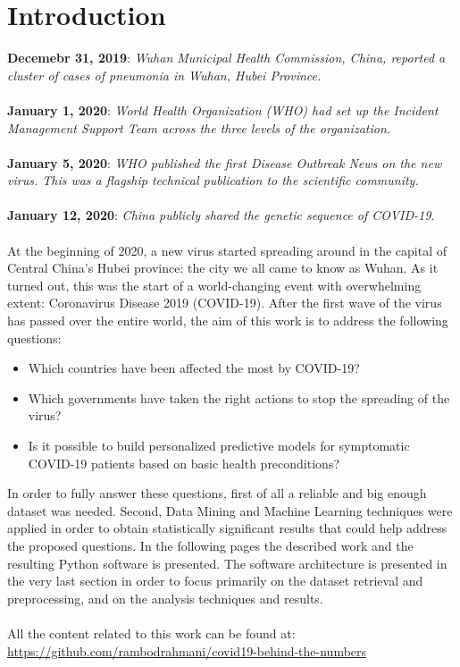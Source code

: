 \documentclass[11pt,a4paper]{article}
\begin{document}
\section{Introduction}
\textbf{Decemebr 31, 2019}: \textit{Wuhan Municipal Health Commission, China,
reported a cluster of cases of pneumonia in Wuhan, Hubei Province.}\\
\\
\textbf{January 1, 2020}: \textit{World Health Organization (WHO) had set up the
Incident Management Support Team across the three levels of the organization.}\\
\\
\textbf{January 5, 2020}: \textit{WHO published the first Disease Outbreak News
on the new virus. This was a flagship technical publication to the scientific
community.}\\
\\
\textbf{January 12, 2020}: \textit{China publicly shared the genetic sequence of
COVID-19.}\\
\\
At the beginning of 2020, a new virus started spreading around in the capital of
Central China's Hubei province: the city we all came to know as Wuhan. As it
turned out, this was the start of a world-changing event with overwhelming
extent: Coronavirus Disease 2019 (COVID-19). After the first wave of the virus
has passed over the entire world, the aim of this work is to address the
following questions:
\begin{itemize}
	\item Which countries have been affected the most by COVID-19?
	\item Which governments have taken the right actions to stop the
		spreading of the virus?
	\item Is it possible to build personalized predictive models for
		symptomatic COVID-19 patients based on basic health preconditions?
\end{itemize}
In order to fully answer these questions, first of all a reliable and big enough
dataset was needed. Second, Data Mining and Machine Learning techniques were
applied in order to obtain statistically significant results that could help
address the proposed questions. In the following pages the described work and
the resulting Python software is presented. The software architecture is
presented in the very last section in order to focus primarily on the dataset
retrieval and preprocessing, and on the analysis techniques and results.\\
\\
All the content related to this work can be found at:
\url{https://github.com/rambodrahmani/covid19-behind-the-numbers}
\end{document}
